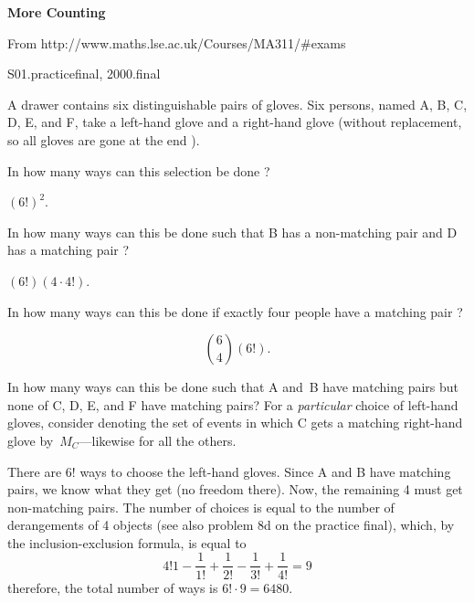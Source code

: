 \begin{problem} \textbf{More Counting}
\begin{staffnotes}
 From http://www.maths.lse.ac.uk/Courses/MA311/\#exams

 S01.practicefinal, 2000.final
\end{staffnotes}

A drawer contains six distinguishable pairs of gloves. Six persons,
named A, B, C, D, E, and F, take a left-hand glove and a right-hand
glove (without replacement, so all gloves are gone at the end ).

\bparts

\ppart In how many ways can this selection be done ?

\begin{solution}
$(6!)^2$.
\end{solution}

\ppart In how many ways can this be done such that B has
a non-matching pair and D has a matching pair ?

\begin{solution}
$(6!)(4\cdot4!)$.
\end{solution}

\ppart In how many ways can this be done if exactly four
people have a matching pair ?

\begin{solution}
\[
\binom{6}{4}(6!).
\]
\end{solution}

\ppart In how many ways can this be done such that A
and~B have matching pairs but none of C, D, E, and F have matching
pairs?  \hint For a \emph{particular} choice of left-hand gloves,
consider denoting the set of events in which C gets a matching
right-hand glove by~$M_C$---likewise for all the others.

\begin{solution}
There are $6!$ ways to choose the left-hand gloves.
  Since A and B have matching pairs, we know what they get (no freedom
  there). Now, the remaining 4 must get non-matching pairs. The number
  of choices is equal to the number of derangements of 4 objects (see
  also problem 8d on the practice final), which, by the
  inclusion-exclusion formula, is equal to
  \[
  4!1-\frac{1}{1!}+\frac{1}{2!}-\frac{1}{3!}+\frac{1}{4!}=9
  \]
  therefore, the total number of ways is $6!\cdot 9 = 6480$.
\end{solution}

\iffalse
  \begin{displaymath}
    6!\biggl(
      4!-\binom{4}{1}3!+\binom{4}{2}2!-\binom{4}{3}1!+\binom{4}{4}0!
    \biggr)
    =
    720\cdot15
    =
    10800.
  \end{displaymath}
\fi

\eparts

\end{problem}


